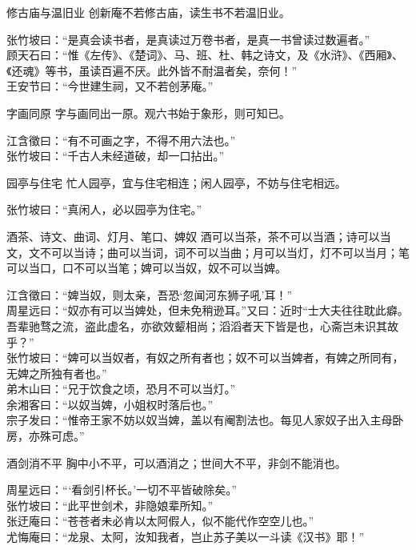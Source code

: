 \begin{yulu}{修古庙与温旧业}
创新庵不若修古庙，读生书不若温旧业。
\begin{comments}
张竹坡曰：“是真会读书者，是真读过万卷书者，是真一书曾读过数遍者。” \\
顾天石曰：“惟《左传》、《楚词》、马、班、杜、韩之诗文，及《水浒》、《西厢》、《还魂》等书，虽读百遍不厌。此外皆不耐温者矣，奈何！” \\
王安节曰：“今世建生祠，又不若创茅庵。”
\end{comments}
\end{yulu}

\begin{yulu}{字画同原}
字与画同出一原。观六书始于象形，则可知已。
\begin{comments}
江含徵曰：“有不可画之字，不得不用六法也。” \\
张竹坡曰：“千古人未经道破，却一口拈出。”
\end{comments}
\end{yulu}

\begin{yulu}{园亭与住宅}
忙人园亭，宜与住宅相连；闲人园亭，不妨与住宅相远。
\begin{comments}
张竹坡曰：“真闲人，必以园亭为住宅。”
\end{comments}
\end{yulu}

\begin{yulu}{酒茶、诗文、曲词、灯月、笔口、婢奴}
酒可以当茶，茶不可以当酒；诗可以当文，文不可以当诗；曲可以当词，词不可以当曲；月可以当灯，灯不可以当月；笔可以当口，口不可以当笔；婢可以当奴，奴不可以当婢。
\begin{comments}
江含徵曰：“婢当奴，则太亲，吾恐‘忽闻河东狮子吼’耳！” \\
周星远曰：“奴亦有可以当婢处，但未免稍逊耳。”又曰：近时“士大夫往往耽此癖。吾辈驰骛之流，盗此虚名，亦欲效颦相尚；滔滔者天下皆是也，心斋岂未识其故乎？” \\
张竹坡曰：“婢可以当奴者，有奴之所有者也；奴不可以当婢者，有婢之所同有，无婢之所独有者也。” \\
弟木山曰：“兄于饮食之顷，恐月不可以当灯。” \\
余湘客曰：“以奴当婢，小姐权时落后也。” \\
宗子发曰：“惟帝王家不妨以奴当婢，盖以有阉割法也。每见人家奴子出入主母卧房，亦殊可虑。”
\end{comments}
\end{yulu}

\begin{yulu}{酒剑消不平}
胸中小不平，可以酒消之；世间大不平，非剑不能消也。
\begin{comments}
周星远曰：“‘看剑引杯长。’一切不平皆破除矣。” \\
张竹坡曰：“此平世剑术，非隐娘辈所知。” \\
张迂庵曰：“苍苍者未必肯以太阿假人，似不能代作空空儿也。” \\
尤悔庵曰：“龙泉、太阿，汝知我者，岂止苏子美以一斗读《汉书》耶！”
\end{comments}
\end{yulu}

